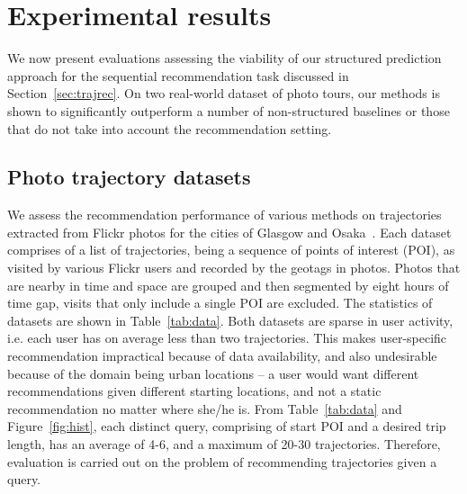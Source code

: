 
\secmoveup
\section{Experimental results}
\label{sec:experiment}
\textmoveup

We now present evaluations assessing the viability of our structured prediction approach
for the sequential recommendation task discussed in Section~\ref{sec:trajrec}. 
On two real-world dataset of photo tours, our methods is shown to significantly outperform 
a number of non-structured baselines or those that do not take into account the recommendation setting. 


\secmoveup
\subsection{Photo trajectory datasets}
\label{sec:dataset}
\textmoveup

We assess the recommendation performance %
of various methods
on trajectories extracted from Flickr photos
for the cities of Glasgow and Osaka~\cite{thomee2016yfcc100m,ijcai15}.
Each dataset comprises of a
list of trajectories, being a sequence of points of interest (POI), as visited by various Flickr users 
and recorded by the geotags in photos. Photos that are nearby in time and space are grouped and then segmented by eight hours of time gap, visits that only include a single POI are excluded. 
The statistics of datasets are shown in Table~\ref{tab:data}. 
Both datasets are sparse in user activity, 
i.e. each user has on average less than two trajectories. 
This makes user-specific recommendation impractical because of
data availability, and also undesirable because of the domain being urban locations 
-- a user would want different recommendations given different starting locations, and not a static recommendation no matter where she/he is. 
From Table~\ref{tab:data} and Figure~\ref{fig:hist}, 
each distinct query, comprising of start POI and a desired trip length, 
has an average of 4-6, and a maximum of 20-30 trajectories.
Therefore, evaluation is carried out on the problem of recommending trajectories given a query. 

